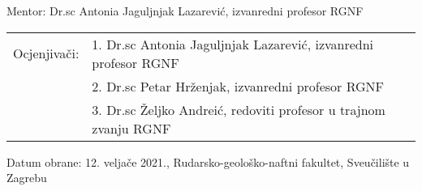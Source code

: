{{\vskip 6mm
Mentor: Dr.sc Antonia Jaguljnjak Lazarević, izvanredni profesor RGNF
\vskip 5mm

\begin{tabular}{@{}l l}
    Ocjenjivači: & 1. Dr.sc Antonia Jaguljnjak Lazarević, izvanredni profesor RGNF\\
                 & 2. Dr.sc Petar Hrženjak, izvanredni profesor RGNF \\
                 & 3. Dr.sc Željko Andreić, redoviti profesor u trajnom zvanju RGNF
\end{tabular}

\vfill

Datum obrane: 12. veljače 2021., Rudarsko-geološko-naftni fakultet, Sveučilište u
Zagrebu
}}
\newpage

